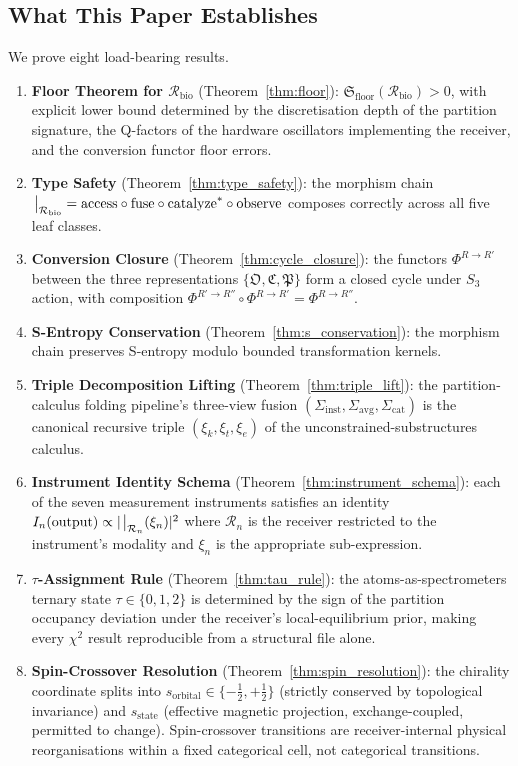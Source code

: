 \documentclass[11pt,twocolumn,a4paper]{article}
\theoremstyle{definition}
\theoremstyle{remark}
\newcommand{\Recv}{\mathcal{R}}
\newcommand{\Floor}{{\mathfrak{S}_{\mathrm{floor}}}}
\newcommand{\Osc}{\mathfrak{O}}
\newcommand{\Cat}{\mathfrak{C}}
\newcommand{\Part}{\mathfrak{P}}
\newcommand{\Sexp}{\xi}
\newcommand{\Sig}{\Sigma}
\begin{document}
\subsection{What This Paper Establishes}

We prove eight load-bearing results.

\begin{enumerate}[leftmargin=*]
\item \textbf{Floor Theorem for $\Recv_{\mathrm{bio}}$} (Theorem~\ref{thm:floor}): $\Floor(\Recv_{\mathrm{bio}}) > 0$, with explicit lower bound determined by the discretisation depth of the partition signature, the Q-factors of the hardware oscillators implementing the receiver, and the conversion functor floor errors.
\item \textbf{Type Safety} (Theorem~\ref{thm:type_safety}): the morphism chain $\eval_{\Recv_{\mathrm{bio}}} = \mathrm{access} \circ \mathrm{fuse} \circ \mathrm{catalyze}^* \circ \mathrm{observe}$ composes correctly across all five leaf classes.
\item \textbf{Conversion Closure} (Theorem~\ref{thm:cycle_closure}): the functors $\Phi^{R \to R'}$ between the three representations $\{\Osc, \Cat, \Part\}$ form a closed cycle under $S_3$ action, with composition $\Phi^{R' \to R''} \circ \Phi^{R \to R'} = \Phi^{R \to R''}$.
\item \textbf{S-Entropy Conservation} (Theorem~\ref{thm:s_conservation}): the morphism chain preserves S-entropy modulo bounded transformation kernels.
\item \textbf{Triple Decomposition Lifting} (Theorem~\ref{thm:triple_lift}): the partition-calculus folding pipeline's three-view fusion $(\Sig_{\mathrm{inst}}, \Sig_{\mathrm{avg}}, \Sig_{\mathrm{cat}})$ is the canonical recursive triple $(\Sexp_k, \Sexp_t, \Sexp_e)$ of the unconstrained-substructures calculus.
\item \textbf{Instrument Identity Schema} (Theorem~\ref{thm:instrument_schema}): each of the seven measurement instruments satisfies an identity $I_n(\text{output}) \propto |\eval_{\Recv_n}(\Sexp_n)|^2$ where $\Recv_n$ is the receiver restricted to the instrument's modality and $\Sexp_n$ is the appropriate sub-expression.
\item \textbf{$\tau$-Assignment Rule} (Theorem~\ref{thm:tau_rule}): the atoms-as-spectrometers ternary state $\tau \in \{0, 1, 2\}$ is determined by the sign of the partition occupancy deviation under the receiver's local-equilibrium prior, making every $\chi^2$ result reproducible from a structural file alone.
\item \textbf{Spin-Crossover Resolution} (Theorem~\ref{thm:spin_resolution}): the chirality coordinate splits into $s_{\mathrm{orbital}} \in \{-\tfrac{1}{2}, +\tfrac{1}{2}\}$ (strictly conserved by topological invariance) and $s_{\mathrm{state}}$ (effective magnetic projection, exchange-coupled, permitted to change). Spin-crossover transitions are receiver-internal physical reorganisations within a fixed categorical cell, not categorical transitions.
\end{enumerate}
\end{document}
